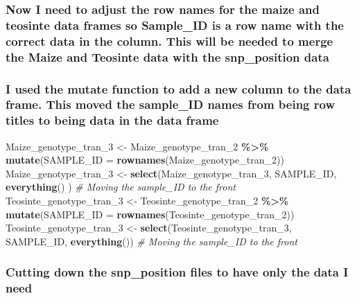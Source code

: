 \documentclass[
]{article}
\newenvironment{Shaded}{\begin{snugshade}}{\end{snugshade}}
\newcommand{\AttributeTok}[1]{\textcolor[rgb]{0.13,0.29,0.53}{#1}}
\newcommand{\CommentTok}[1]{\textcolor[rgb]{0.56,0.35,0.01}{\textit{#1}}}
\newcommand{\FunctionTok}[1]{\textcolor[rgb]{0.13,0.29,0.53}{\textbf{#1}}}
\newcommand{\NormalTok}[1]{#1}
\newcommand{\OtherTok}[1]{\textcolor[rgb]{0.56,0.35,0.01}{#1}}
\newcommand{\SpecialCharTok}[1]{\textcolor[rgb]{0.81,0.36,0.00}{\textbf{#1}}}
\begin{document}
\subsubsection{Now I need to adjust the row names for the maize and
teosinte data frames so Sample\_ID is a row name with the correct data
in the column. This will be needed to merge the Maize and Teosinte data
with the snp\_position
data}\label{now-i-need-to-adjust-the-row-names-for-the-maize-and-teosinte-data-frames-so-sample_id-is-a-row-name-with-the-correct-data-in-the-column.-this-will-be-needed-to-merge-the-maize-and-teosinte-data-with-the-snp_position-data}

\subsubsection{I used the mutate function to add a new column to the
data frame. This moved the sample\_ID names from being row titles to
being data in the data
frame}\label{i-used-the-mutate-function-to-add-a-new-column-to-the-data-frame.-this-moved-the-sample_id-names-from-being-row-titles-to-being-data-in-the-data-frame}

\begin{Shaded}
\begin{Highlighting}[]
\NormalTok{Maize\_genotype\_tran\_3 }\OtherTok{\textless{}{-}}\NormalTok{ Maize\_genotype\_tran\_2 }\SpecialCharTok{\%\textgreater{}\%} \FunctionTok{mutate}\NormalTok{(}\AttributeTok{SAMPLE\_ID =} \FunctionTok{rownames}\NormalTok{(Maize\_genotype\_tran\_2))}
\NormalTok{Maize\_genotype\_tran\_3 }\OtherTok{\textless{}{-}} \FunctionTok{select}\NormalTok{(Maize\_genotype\_tran\_3, SAMPLE\_ID, }\FunctionTok{everything}\NormalTok{() ) }\CommentTok{\# Moving the sample\_ID to the front}
\NormalTok{Teosinte\_genotype\_tran\_3 }\OtherTok{\textless{}{-}}\NormalTok{ Teosinte\_genotype\_tran\_2 }\SpecialCharTok{\%\textgreater{}\%} \FunctionTok{mutate}\NormalTok{(}\AttributeTok{SAMPLE\_ID =} \FunctionTok{rownames}\NormalTok{(Teosinte\_genotype\_tran\_2))}
\NormalTok{Teosinte\_genotype\_tran\_3 }\OtherTok{\textless{}{-}} \FunctionTok{select}\NormalTok{(Teosinte\_genotype\_tran\_3, SAMPLE\_ID, }\FunctionTok{everything}\NormalTok{()) }\CommentTok{\# Moving the sample\_ID to the front}
\end{Highlighting}
\end{Shaded}

\subsubsection{Cutting down the snp\_position files to have only the
data I
need}\label{cutting-down-the-snp_position-files-to-have-only-the-data-i-need}
\end{document}
